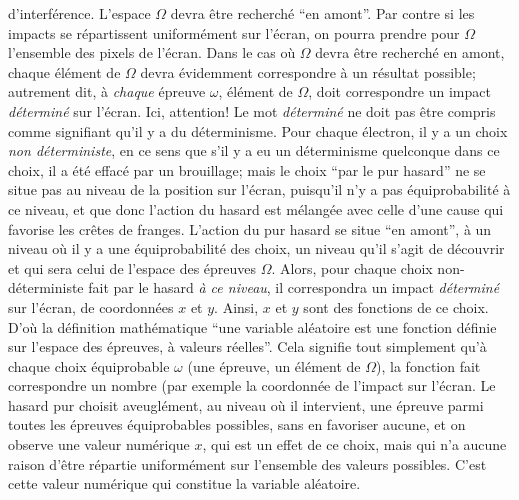 d'interf\'erence. L'espace $\Omega$ devra \^etre recherch\'e ``en amont''.
Par contre si les impacts se r\'epartissent uniform\'ement sur l'\'ecran,
on pourra prendre pour $\Omega$ l'ensemble des pixels de l'\'ecran. Dans
le cas o\`u $\Omega$ devra \^etre  recherch\'e en amont, chaque
\'el\'ement de $\Omega$ devra \'evidemment correspondre \`a un
r\'esultat possible; autrement dit, \`a {\it chaque} \'epreuve $\omega$,
\'el\'ement de $\Omega$, doit correspondre un impact {\it d\'etermin\'e}
sur l'\'ecran. Ici, attention! Le mot {\it d\'etermin\'e} ne doit  pas \^etre
compris comme signifiant qu'il y a du d\'eterminisme. Pour chaque
\'electron, il y a un choix {\it non d\'eterministe}, en ce sens que s'il y a
eu un d\'eterminisme quelconque dans ce choix, il a \'et\'e effac\'e
par un brouillage; mais le choix ``par le pur hasard'' ne se situe pas au
niveau de la position sur l'\'ecran, puisqu'il n'y a pas \'equiprobabilit\'e
\`a ce niveau, et que donc l'action du hasard est m\'elang\'ee avec celle
d'une cause qui favorise les cr\^etes de franges. L'action du pur hasard se
situe ``en amont'', \`a un niveau o\`u il y a une \'equiprobabilit\'e des
choix, un niveau qu'il s'agit de d\'ecouvrir et qui sera celui de l'espace
des \'epreuves $\Omega$. Alors, pour chaque choix non-d\'eterministe
fait par le hasard {\it \`a ce niveau}, il correspondra un impact {\it
d\'etermin\'e} sur l'\'ecran, de coordonn\'ees $x$ et $y$. Ainsi, $x$ et $y$
sont des fonctions de ce choix.   
\medskip  
D'o\`u la d\'efinition math\'ematique ``une variable al\'eatoire est une 
fonction d\'efinie sur l'espace des \'epreuves, \`a valeurs r\'eelles''. Cela
signifie tout simplement qu'\`a chaque choix \'equiprobable $\omega$ 
(une \'epreuve, un \'el\'ement de $\Omega$), la fonction fait correspondre
un nombre (par exemple la coordonn\'ee de l'impact sur l'\'ecran. Le 
hasard pur choisit aveugl\'ement, au  niveau o\`u il intervient, une
\'epreuve parmi toutes les \'epreuves \'equiprobables possibles, sans en
favoriser aucune, et on observe une valeur num\'erique $x$, qui est  un
effet de ce choix, mais qui n'a aucune raison d'\^etre r\'epartie
uniform\'ement sur l'ensemble des valeurs possibles. C'est cette valeur
num\'erique qui constitue la variable al\'eatoire. 

\bigskip

